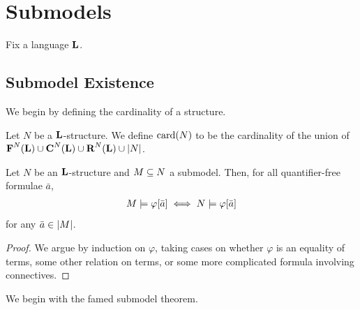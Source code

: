 \section{Submodels}

Fix a language $\mathbf{L}$.

\subsection{Submodel Existence}

We begin by defining the cardinality of a structure.

\begin{boxdefinition}
    Let $N$ be a $\mathbf{L}$-structure. We define $\operatorname{card}\!\left( N \right)$ to be the cardinality of the union of $\textbf{F}^N(\mathbf{L})\cup \textbf{C}^N(\mathbf{L})\cup \textbf{R}^N(\mathbf{L})\cup |N|$.
\end{boxdefinition}

\begin{boxlemma}
    Let $N$ be an $\mathbf{L}$-structure and $M \subseteq N$ a submodel. Then, for all quantifier-free formulae $\bar{a}$,
    \begin{align*}
        M \models \varphi\!\left[ \bar{a} \right] \iff N \models \varphi\!\left[ \bar{a} \right]
    \end{align*}
    for any $\bar{a} \in \left\lvert M \right\rvert$.
\end{boxlemma}
\begin{proof}
    We argue by induction on $\varphi$, taking cases on whether $\varphi$ is an equality of terms, some other relation on terms, or some more complicated formula involving connectives.
\end{proof}

We begin with the famed submodel theorem.

